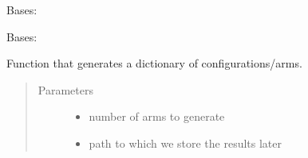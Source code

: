 \documentclass[letterpaper,10pt,english]{sphinxmanual}
\begin{document}
\begin{fulllineitems}
\label{\detokenize{index:classifiers.cnn.ConvolutionPoolLayer}}
Bases: 

\end{fulllineitems}

\label{\detokenize{index:module-classifiers.ada_sklearn}}

\begin{fulllineitems}
\label{\detokenize{index:classifiers.ada_sklearn.Ada}}
Bases: {\hyperref[\detokenize{index:models.Model}]{}}

\begin{fulllineitems}
\label{\detokenize{index:classifiers.ada_sklearn.Ada.eval}}
\end{fulllineitems}


\begin{fulllineitems}
\label{\detokenize{index:classifiers.ada_sklearn.Ada.generate_arms}}
Function that generates a dictionary of configurations/arms.
\begin{quote}\begin{description}
\item[{Parameters}] \leavevmode\begin{itemize}
\item {} 
 \textendash{} number of arms to generate

\item {} 
 \textendash{} path to which we store the results later


\end{itemize}
\end{description}
\end{quote}
\end{fulllineitems}
\end{fulllineitems}
\end{document}
